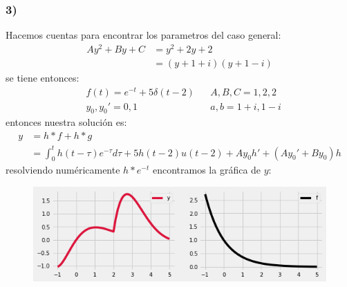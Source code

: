 \documentclass{article}
\begin{document}
\begin{tcolorbox}[breakable]
    \subsubsection*{3)}
    Hacemos cuentas para encontrar los parametros del caso general:
    \begin{align*}
        Ay^2 + By + C 
        &= y^2 + 2y + 2 \\
        &= (y+1+i)(y+1-i)
    \end{align*}
    se tiene entonces:
    \begin{align*}
        &f(t) = e^{-t} + 5\delta(t-2)
        &&A, B, C = 1, 2, 2 \\ 
        &y_0, y_0' = 0,1
        &&a,b = 1+i, 1-i   
    \end{align*}    
    entonces nuestra solución es:
    \begin{align*}
        y
        &= h*f + h*g \\
        &= \int_{0}^t h(t-\tau)e^{-\tau}d\tau + 5h(t-2)u(t-2)  + Ay_0h' + (Ay_0'+By_0)h 
    \end{align*}
    resolviendo numéricamente $h*e^{-t}$ encontramos la gráfica de $y$:
    \begin{figure}[H]
        \centering
        \includegraphics[scale=0.7]{images/p1_3.png}
    \end{figure}


\end{tcolorbox}
\end{document}

